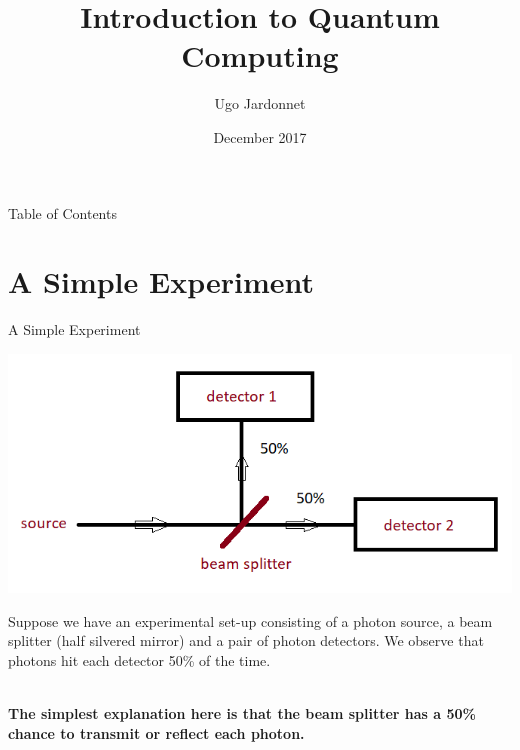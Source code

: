 \documentclass[svgnames,smaller,aspectratio=169]{beamer}
\title{Introduction to Quantum Computing}
\author{Ugo Jardonnet}
\date{December 2017}
\newcommand*{\cpp}{\texttt{C++}}
\newcommand*{\csharp}{\texttt{C\#}}
\begin{document}

\begin{frame}
  \titlepage
\end{frame}

\begin{frame}{Table of Contents}
  \tableofcontents
\end{frame}


\section{A Simple Experiment}

\newcommand{\iu}{\mathrm{i}\mkern1mu}

\begin{frame}[fragile]{A Simple Experiment}
   \begin{center}
      \includegraphics[height=.4\textheight]{exp1}
  \end{center}
  Suppose we have an experimental set-up consisting of a photon source, a beam splitter (half silvered mirror) and a
  pair of photon detectors.  We observe that photons hit each detector 50\% of the time. \\~\
  
  \noindent
  \textbf{The simplest explanation here is that the beam splitter has a 50\% chance to transmit or reflect each photon.}
\end{frame}
\end{document}
